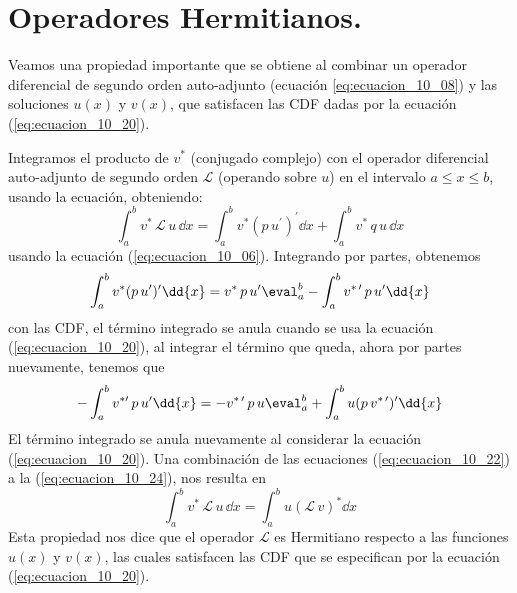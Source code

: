 \section{Operadores Hermitianos.}
Veamos una propiedad importante que se obtiene al combinar un operador diferencial de segundo orden auto-adjunto (ecuación \ref{eq:ecuacion_10_08}) y las soluciones $u(x)$ y $v(x)$, que satisfacen las CDF dadas por la ecuación (\ref{eq:ecuacion_10_20}).
\par
Integramos el producto de $v^{*}$ (conjugado complejo) con el operador diferencial auto-adjunto de segundo orden $\mathcal{L}$ (operando sobre $u$) en el intervalo $a \leq x \leq b$, usando la ecuación, obteniendo:
\begin{equation}
\int_{a}^{b} v^{*} \, \mathcal{L} \, u \, \dd{x} = \int_{a}^{b} v^{*} (p \, u^{\prime})^{\prime} \dd{x} + \int_{a}^{b} v^{*} \, q \, u \, \dd{x}
\label{eq:ecuacion_10_22}
\end{equation}
usando la ecuación (\ref{eq:ecuacion_10_06}). Integrando por partes, obtenemos
\begin{equation}
\int_{a}^{b} v^{*}(p \, u^{\prime})^{\prime} \dd{x} = v^{*} \, p \, u^{\prime} \eval_{a}^{b} - \int_{a}^{b} v^{* \, \prime} \, p \, u^{\prime} \dd{x}
\label{eq:ecuacion_10_23}
\end{equation}
con las CDF, el término integrado se anula cuando se usa la ecuación (\ref{eq:ecuacion_10_20}), al integrar el término que queda, ahora por partes nuevamente, tenemos que
\begin{equation}
- \int_{a}^{b} v^{* \prime} \, p \, u^{\prime} \dd{x} = - v^{* \, \prime} \, p \, u \eval_{a}^{b} + \int_{a}^{b} u(p \, v^{* \, \prime})^{\prime} \dd{x}
\label{eq:ecuacion_10_24}
\end{equation}
El término integrado se anula nuevamente al considerar la ecuación (\ref{eq:ecuacion_10_20}). Una combinación de las ecuaciones (\ref{eq:ecuacion_10_22}) a la (\ref{eq:ecuacion_10_24}), nos resulta en
\begin{equation}
\int_{a}^{b} v^{*} \, \mathcal{L} \, u \, \dd{x} = \int_{a}^{b} u (\mathcal{L}  \, v)^{*} \dd{x}
\label{eq:ecuacion_10_25}
\end{equation}
Esta propiedad nos dice que el operador $\mathcal{L}$ es Hermitiano respecto a las funciones $u(x)$ y $v(x)$, las cuales satisfacen las CDF que se especifican por la ecuación (\ref{eq:ecuacion_10_20}).
